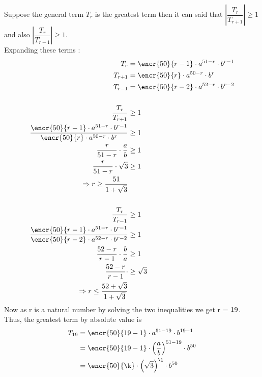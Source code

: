 \begin{solution}
Suppose the general term $T_{r}$ is the greatest term then it can said that $|\dfrac{T_{r}}{T_{r+1}}| \geq 1$ \\ 
and also $|\dfrac{T_{r}}{T_{r-1}}| \geq 1$.\\
Expanding these terms : 
\begin{align}
{T}_{r} &= \encr{50}{r-1} \cdot a^{51-r} \cdot b^{r-1} \\ 
{T}_{r+1} &= \encr{50}{r} \cdot a^{50-r} \cdot b^{r} \\
{T}_{r-1} &= \encr{50}{r-2} \cdot a^{52-r} \cdot b^{r-2} \\
\nonumber \\
\dfrac{T_{r}}{T_{r+1}} &\geq 1 \\
\dfrac{\encr{50}{r-1} \cdot a^{51-r} \cdot b^{r-1}}{\encr{50}{r} \cdot a^{50-r} \cdot b^{r}} &\geq 1 \\
\dfrac{r}{51-r} \cdot \dfrac{a}{b} &\geq 1 \\
\dfrac{r}{51-r} \cdot \vbone &\geq 1 \\
\Rightarrow r \geq \dfrac{51}{1+\vbone} \\
\nonumber \\
\dfrac{T_{r}}{T_{r-1}} &\geq 1 \\
\dfrac{\encr{50}{r-1} \cdot a^{51-r} \cdot b^{r-1}}{\encr{50}{r-2} \cdot a^{52-r} \cdot b^{r-2}} &\geq 1 \\
\dfrac{52-r}{r-1} \cdot \dfrac{b}{a} &\geq 1 \\
\dfrac{52-r}{r-1} \cdot &\geq \vbone \\
\Rightarrow r \leq \dfrac{52+\vbone}{1+\vbone} \\
\end{align}  
Now as r is a natural number by solving the two inequalities we get r = $19$. \\
Thus, the greatest term by absolute value is 
\begin{align}
T_{\vbtwo} &=\encr{50}{\vbtwo- 1} \cdot a^{51-\vbtwo} \cdot b^{\vbtwo- 1}  \\
&=\encr{50}{\vbtwo- 1} \cdot \left({\dfrac{a}{b}}\right)^{51-\vbtwo} \cdot b^{50} \\
&=\encr{50}{\k} \cdot \left({\vbone}\right)^{\l} \cdot b^{50}  
\end{align}
\end{solution}


